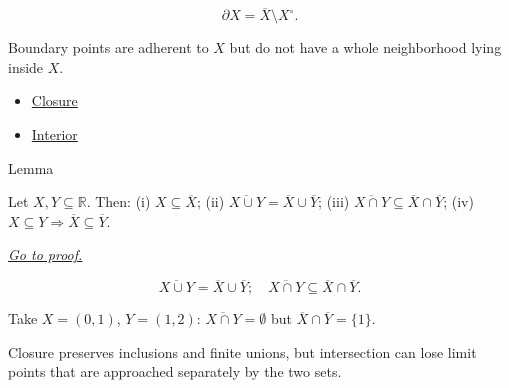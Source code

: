 \begin{remark*}
\[
  \partial X=\overline{X}\setminus X^\circ.
\]
\end{remark*}

\begin{remark*}[Interpretation]
Boundary points are adherent to \(X\) but do not have a whole neighborhood
lying inside \(X\).
\end{remark*}

\begin{dependencies}
\begin{itemize}
  \item \hyperref[def:closure-r]{Closure}
  \item \hyperref[def:interior-r]{Interior}
\end{itemize}
\end{dependencies}


\begin{lemmabox}{Lemma}
\begin{lemma}
\label{lem:closure-elementary}
Let $X, Y \subseteq \mathbb{R}$. Then: (i) $X \subseteq \overline{X}$;
(ii) $\overline{X \cup Y} = \overline{X} \cup \overline{Y}$;
(iii) $\overline{X \cap Y} \subseteq \overline{X} \cap \overline{Y}$;
(iv) $X \subseteq Y \Rightarrow \overline{X} \subseteq \overline{Y}$.

\smallskip\noindent
\hyperref[prf:closure-elementary]{\textit{Go to proof.}}
\end{lemma}
\end{lemmabox}

\begin{remark*}
\[
  \overline{X \cup Y} = \overline{X} \cup \overline{Y};\quad
  \overline{X \cap Y} \subseteq \overline{X} \cap \overline{Y}.
\]
\end{remark*}

\begin{remark*}[Interpretation]
Take $X = (0,1)$, $Y = (1,2)$: $\overline{X\cap Y} = \emptyset$ but
$\overline{X}\cap\overline{Y} = \{1\}$.


Closure preserves inclusions and finite unions, but intersection can lose
limit points that are approached separately by the two sets.
\end{remark*}


